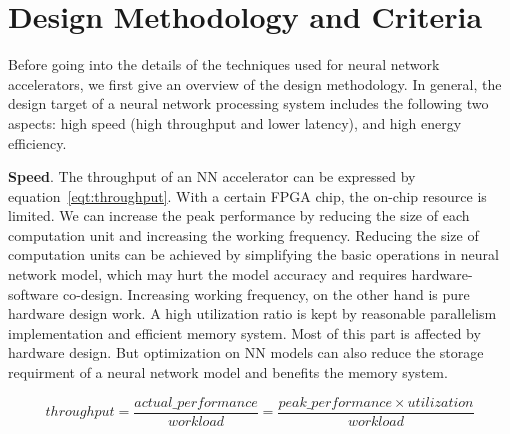 \section{Design Methodology and Criteria}\label{sec:design_method}

Before going into the details of the techniques used for neural network accelerators, we first give an overview of the design methodology. In general, the design target of a neural network processing system includes the following two aspects: high speed (high throughput and lower latency), and high energy efficiency.

\textbf{Speed}. The throughput of an NN accelerator can be expressed by equation~\ref{eqt:throughput}.  With a certain FPGA chip, the on-chip resource is limited. We can increase the peak performance by reducing the size of each computation unit and increasing the working frequency. Reducing the size of computation units can be achieved by simplifying the basic operations in neural network model, which may hurt the model accuracy and requires hardware-software co-design. Increasing working frequency, on the other hand is pure hardware design work. A high utilization ratio is kept by reasonable parallelism implementation and efficient memory system. Most of this part is affected by hardware design. But optimization on NN models can also reduce the storage requirment of a neural network model and benefits the memory system.

\begin{equation}\label{eqt:throughput}
    throughput = \frac{actual\_performance}{workload} = \frac{peak\_performance \times utilization}{workload}
\end{equation}


